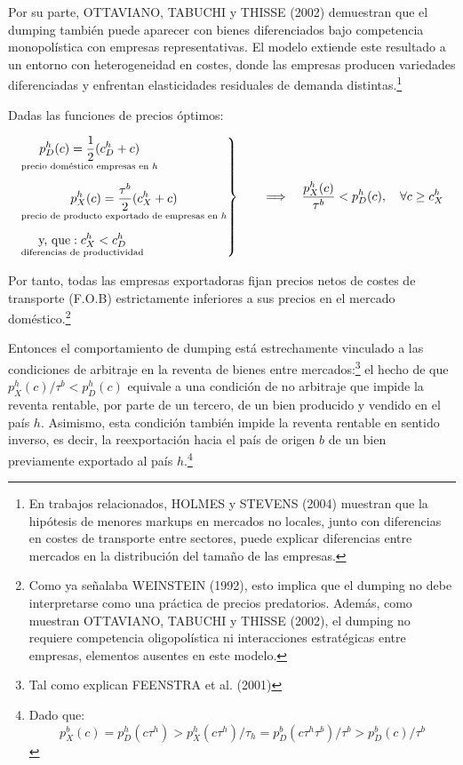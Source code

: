 \documentclass[10pt,a4paper]{article}
\begin{document}
Por su parte, OTTAVIANO, TABUCHI y THISSE (2002) demuestran que el dumping también puede aparecer con bienes diferenciados bajo competencia monopolística con empresas representativas. El modelo extiende este resultado a un entorno con heterogeneidad en costes, donde las empresas producen variedades diferenciadas y enfrentan elasticidades residuales de demanda distintas.\footnote{%
    En trabajos relacionados, HOLMES y STEVENS (2004) muestran que la hipótesis de menores markups en mercados no locales, junto con diferencias en costes de transporte entre sectores, puede explicar diferencias entre mercados en la distribución del tamaño de las empresas.
}

Dadas las funciones de precios óptimos:

$$\left.\begin{aligned}
    &\underset{\text{\scriptsize precio doméstico empresas en $h$}}{p_D^h(c) = \frac{1}{2}(c_D^h + c)}\\[0.5em]
    &\underset{\text{\scriptsize precio de producto exportado de empresas en $h$}}{p_X^h(c) = \frac{\tau^b}{2}(c_X^h + c)}\\[0.5em]
    &\underset{\text{\scriptsize diferencias de productividad}}{\text{y, que}: c_X^h < c_D^h}
\end{aligned}\right\}\qquad\Longrightarrow \quad \frac{p_X^h(c)}{\tau^b} < p_D^h(c),\quad \forall c\ge c_X^h$$  

Por tanto, todas las empresas exportadoras fijan precios netos de costes de transporte (F.O.B) estrictamente inferiores a sus precios en el mercado doméstico.\footnote{%
    Como ya señalaba WEINSTEIN (1992), esto implica que el dumping no debe interpretarse como una práctica de precios predatorios. Además, como muestran OTTAVIANO, TABUCHI y THISSE (2002), el dumping no requiere competencia oligopolística ni interacciones estratégicas entre empresas, elementos ausentes en este modelo.
}

Entonces el comportamiento de dumping está estrechamente vinculado a las condiciones de arbitraje en la reventa de bienes entre mercados:\footnote{Tal como explican FEENSTRA et al. (2001)
} el hecho de que $p_X^h(c)/\tau^b < p_D^h(c)$ equivale a una condición de no arbitraje que impide la reventa rentable, por parte de un tercero, de un bien producido y vendido en el país $h$. Asimismo, esta condición también impide la reventa rentable en sentido inverso, es decir, la reexportación hacia el país de origen $b$ de un bien previamente exportado al país $h$.\footnote{%
    Dado que:
$$p_X^b(c) = p_D^h(c\tau^h) > p_X^h(c\tau^h)/\tau_h = p_D^b(c\tau^h\tau^b)/\tau^b > p_D^b(c)/\tau^b$$
}
\end{document}
